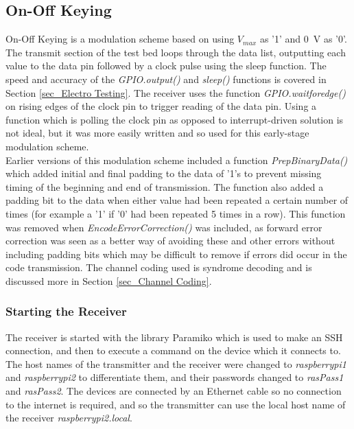 \documentclass[../main.tex]{subfiles}
\begin{document}
\subsection{On-Off Keying} \label{sec_On-Off Keying}

On-Off Keying is a modulation scheme based on using $V_{max}$ as '1' and \SI{0}{\volt} as '0'.
The transmit section of the test bed loops through the data list, outputting each value to the data pin followed by a clock pulse using the sleep function.
The speed and accuracy of the \textit{GPIO.output()} and \textit{sleep()} functions is covered in Section \ref{sec_Electro Testing}.
The receiver uses the function \textit{GPIO.wait\textunderscore for\textunderscore edge()} on rising edges of the clock pin to trigger reading of the data pin.
Using a function which is polling the clock pin as opposed to interrupt-driven solution is not ideal, but it was more easily written and so used for this early-stage modulation scheme.\\

Earlier versions of this modulation scheme included a function \textit{Prep\textunderscore Binary\textunderscore Data()} which added initial and final padding to the data of '1's to prevent missing timing of the beginning and end of transmission.
The function also added a padding bit to the data when either value had been repeated a certain number of times (for example a '1' if '0' had been repeated 5 times in a row).
This function was removed when \textit{Encode\textunderscore Error\textunderscore Correction()} was included, as forward error correction was seen as a better way of avoiding these and other errors without including padding bits which may be difficult to remove if errors did occur in the code transmission.
The channel coding used is syndrome decoding and is discussed more in Section \ref{sec_Channel Coding}.\\


\subsubsection{Starting the Receiver} \label{sec_SSH}

The receiver is started with the library Paramiko \cite{lib_Paramiko} which is used to make an SSH connection, and then to execute a command on the device which it connects to.
The host names of the transmitter and the receiver were changed to \textit{raspberrypi1} and \textit{raspberrypi2} to differentiate them, and their passwords changed to \textit{rasPass1} and \textit{rasPass2}.
The devices are connected by an Ethernet cable so no connection to the internet is required, and so the transmitter can use the local host name of the receiver \textit{raspberrypi2.local}.\\
\end{document}
